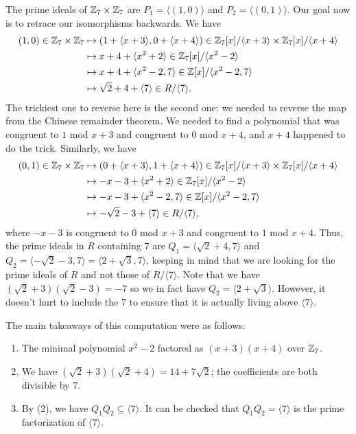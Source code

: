 The prime ideals of $\mathbb{Z}_7 \times \mathbb{Z}_7$ are 
$P_1 = \langle (1, 0) \rangle$ and $P_2 = \langle (0, 1) \rangle$. 
Our goal now is to retrace our isomorphisms backwards. We have 
\begin{align*}
    (1, 0) \in \mathbb{Z}_7 \times \mathbb{Z}_7 
    &\mapsto (1 + \langle x+3 \rangle, 0 + \langle x+4 \rangle) \in \mathbb{Z}_7[x]/\langle x+3\rangle 
    \times \mathbb{Z}_7[x]/\langle x+4 \rangle \\ 
    &\mapsto x+4 + \langle x^2 + 2 \rangle \in \mathbb{Z}_7[x]/\langle x^2 - 2 \rangle \\ 
    &\mapsto x+4 + \langle x^2 - 2, 7 \rangle \in \mathbb{Z}[x]/\langle x^2 - 2, 7 \rangle \\ 
    &\mapsto \sqrt{2} + 4 + \langle 7 \rangle \in R/\langle 7 \rangle. 
\end{align*}
The trickiest one to reverse here is the second one: we needed to reverse 
the map from the Chinese remainder theorem. We needed to find a polynomial 
that was congruent to $1$ mod $x+3$ and congruent to $0$ mod $x+4$, 
and $x+4$ happened to do the trick. Similarly, we have 
\begin{align*}
    (0, 1) \in \mathbb{Z}_7 \times \mathbb{Z}_7 
    &\mapsto (0 + \langle x+3 \rangle, 1 + \langle x+4 \rangle) \in \mathbb{Z}_7[x]/\langle x+3\rangle 
    \times \mathbb{Z}_7[x]/\langle x+4 \rangle \\ 
    &\mapsto -x-3 + \langle x^2 + 2 \rangle \in \mathbb{Z}_7[x]/\langle x^2 - 2 \rangle \\ 
    &\mapsto -x-3 + \langle x^2 - 2, 7 \rangle \in \mathbb{Z}[x]/\langle x^2 - 2, 7 \rangle \\ 
    &\mapsto -\sqrt{2} - 3 + \langle 7 \rangle \in R/\langle 7 \rangle, 
\end{align*}
where $-x-3$ is congruent to $0$ mod $x+3$ and congruent to $1$ mod $x+4$. 
Thus, the prime ideals in $R$ containing $7$ are $Q_1 = \langle \sqrt{2} + 4, 7
\rangle$ and $Q_2 = \langle -\sqrt{2} - 3, 7 \rangle = \langle 2+\sqrt{3}, 7 \rangle$, 
keeping in mind that we are looking for the prime ideals of $R$ and not those 
of $R/\langle 7 \rangle$. Note that we have $(\sqrt{2} + 3)(\sqrt{2} - 3) = -7$
so we in fact have $Q_2 = \langle 2 + \sqrt{3} \rangle$. However, it doesn't 
hurt to include the $7$ to ensure that it is actually living above 
$\langle 7 \rangle$.

The main takeaways of this computation were as follows: 
\begin{enumerate}[(1)]
    \item The minimal polynomial $x^2 - 2$ factored as $(x+3)(x+4)$ over $\mathbb{Z}_7$. 
    \item We have $(\sqrt{2} + 3)(\sqrt{2} + 4) = 14 + 7\sqrt{2}$; the coefficients 
    are both divisible by $7$. 
    \item By (2), we have $Q_1Q_2 \subseteq \langle 7 \rangle$. 
    It can be checked that $Q_1Q_2 = \langle 7 \rangle$ is the prime 
    factorization of $\langle 7 \rangle$.
\end{enumerate}

